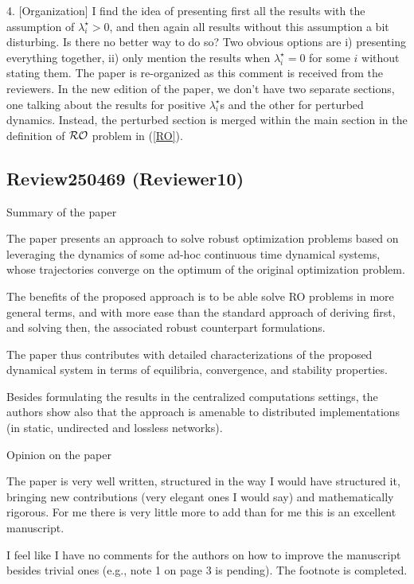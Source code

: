 \documentclass[journal,twoside,web]{ieeecolor}
\begin{document}
4. [Organization]
I find the idea of presenting first all the results with the assumption of $\lambda^\star_i>0$, and then again all results without this assumption a bit disturbing. Is there no better way to do so? Two obvious options are i) presenting everything together, ii) only mention the results when $\lambda^\star_i=0$ for some $i$ without stating them. {\color{blue} The paper is re-organized as this comment is received from the reviewers. In the new edition of the paper, we don't have two separate sections, one talking about the results for positive $\lambda^\star_i$s and the other for perturbed dynamics. Instead, the perturbed section is merged within the main section in the definition of ${\cal RO}$ problem in (\ref{RO}).}

\subsection{Review250469 (Reviewer10)}

Summary of the paper

The paper presents an approach to solve robust optimization problems based on leveraging the dynamics of some ad-hoc continuous time dynamical systems, whose trajectories converge on the optimum of the original optimization problem.

The benefits of the proposed approach is to be able solve RO problems in more general terms, and with more ease than the standard approach of deriving first, and solving then, the associated robust counterpart formulations.

The paper thus contributes with detailed characterizations of the proposed dynamical system in terms of equilibria, convergence, and stability properties.

Besides formulating the results in the centralized computations settings, the authors show also that the approach is amenable to distributed implementations (in static, undirected and lossless networks).

Opinion on the paper

The paper is very well written, structured in the way I would have structured it, bringing new contributions (very elegant ones I would say) and mathematically rigorous. For me there is very little more to add than for me this is an excellent manuscript.

I feel like I have no comments for the authors on how to improve the manuscript besides trivial ones (e.g., note 1 on page 3 is pending). {\color{blue} The footnote is completed.}
\end{document}
